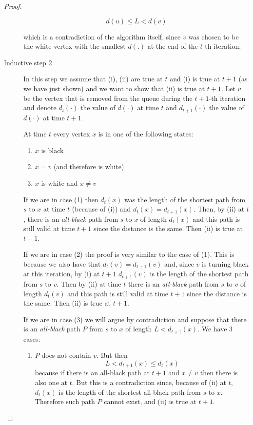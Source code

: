 \documentclass[12pt]{extarticle}
\begin{document}
\begin{proof}
\begin{description}
              $$
                  d(u) \leq L < d(v)
              $$

              which is a contradiction of the algorithm itself, since $v$ was chosen to be the white vertex with the smallest $d(.)$ at the end of the $t$-th iteration.

        \item[Inductive step 2]
              In this step we assume that (i), (ii) are true at $t$ and (i) is true at $t+1$ (as we have just shown) and we want to show that (ii) is true at $t+1$.
              Let $v$ be the vertex that is removed from the queue during the $t+1$-th iteration and denote $d_t(\cdot)$ the value of $d(\cdot)$ at time $t$ and $d_{t+1}(\cdot)$ the value of $d(\cdot)$ at time $t+1$.

              At time $t$ every vertex $x$ is in one of the following states:
              \begin{enumerate}
                  \item $x$ is black
                  \item $x = v$ (and therefore is white)
                  \item $x$ is white and $x \neq v$
              \end{enumerate}

              If we are in case (1) then $d_t(x)$ was the length of the shortest path from $s$ to $x$ at time $t$ (because of (i)) and $d_t(x) = d_{t+1}(x)$.
              Then, by (ii) at $t$, there is an \textit{all-black} path from $s$ to $x$ of length $d_t(x)$ and this path is still valid at time $t+1$ since the distance is the same. Then (ii) is true at $t+1$.

              If we are in case (2) the proof is very similar to the case of (1).
              This is because we also have that $d_t(v) = d_{t+1}(v)$ and, since $v$ is turning black at this iteration, by (i) at $t+1$ $d_{t+1}(v)$ is the length of the shortest path from $s$ to $v$.
              Then by (ii) at time $t$ there is an \textit{all-black} path from $s$ to $v$ of length $d_t(v)$ and this path is still valid at time $t+1$ since the distance is the same. Then (ii) is true at $t+1$.

              If we are in case (3) we will argue by contradiction and suppose that there is an \textit{all-black} path $P$ from $s$ to $x$ of length $L < d_{t+1}(x)$.
              We have 3 cases:
              \begin{enumerate}[label=\alph*.]
                  \item
                        $P$ does not contain $v$.
                        But then
                        $$
                            L < d_{t+1}(x) \leq d_t(x)$$
                        because if there is an all-black path at $t+1$ and $x \neq v$ then there is also one at $t$.
                        But this is a contradiction since, because of (ii) at $t$, $d_t(x)$ is the length of the shortest all-black path from $s$ to $x$. Therefore such path $P$ cannot exist, and (ii) is true at $t+1$.


\end{enumerate}
\end{description}
\end{proof}
\end{document}
